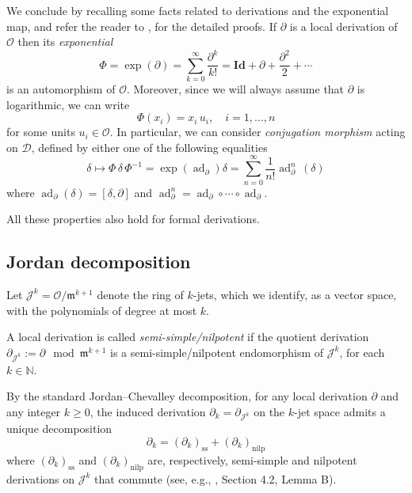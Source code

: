 \documentclass[10pt,twoside,reqno]{amsart}
\theoremstyle{remark}
\theoremstyle{remark}
\newcommand{\ad}{\operatorname{ad}}
\newcommand{\tmop}[1]{{\operatorname{#1}}}
\newcommand{\oO}{\mathcal{O}}
\newcommand{\cD}{\mathcal{D}}
\newcommand{\vO}{\mathcal{O}}
\begin{document}
We conclude by recalling some facts related to derivations and the exponential map, and refer the reader to \cite{Bourbaki2007},  for the detailed proofs. If $\partial$ is a local derivation of $\oO$ then its {\em exponential}
\begin{equation}\label{exponential-formula}
\Phi = \exp(\partial) = \sum_{k=0}^\infty \frac{\partial^k}{k !} = \mathbf{Id} + \partial + \frac{\partial^2}{2}+\cdots
\end{equation}
is an automorphism of $\oO$. Moreover, since we will always assume that $\partial$ is logarithmic, we can write
$$\Phi(x_i) = x_i\, u_i,\quad i=1,\ldots,n$$
for some units $u_i \in \oO$. In particular, we can consider {\em conjugation morphism} acting on $\cD$, defined by either one of the following equalities 
\begin{equation}\label{conjugation-morphism}
\delta \mapsto  \Phi\, \delta\, \Phi^{-1} = \exp(\ad_\partial) \delta = \sum_{n=0}^\infty \frac{1}{n!} \ad_\partial^n\, (\delta)
\end{equation}
where $\ad_\partial (\delta) = [\delta,\partial]$ and $\ad_\partial^n = \ad_\partial \circ \cdots \circ \ad_\partial$. 

All these properties also hold for formal derivations.


\subsection{Jordan decomposition}\label{subsect-jordan-decomp}

Let $\mathcal{J}^k = \vO / \mathfrak{m}^{k + 1}$ denote the ring of $k$-jets,
which we identify, as a vector space, with the polynomials of degree at most
$k$. 

A local derivation is called \emph{semi-simple/nilpotent} if the quotient derivation
${\partial_{\mathcal{J}^k}}:= \partial \mod \mathfrak{m}^{k+1} $ is a semi-simple/nilpotent endomorphism of $\mathcal{J}^k$, for
each $k \in \mathbb{N}$.  

By the standard Jordan--Chevalley decomposition, for any local derivation $\partial$ and any integer $k \ge 0$, the induced derivation $\partial_k = {\partial_{\mathcal{J}^k}}$ on the $k$-jet space admits a unique decomposition
$$
\partial_k = (\partial_k)_{\tmop{ss}} + (\partial_k)_{\tmop{nilp}}
$$
where $(\partial_k)_{\tmop{ss}}$ and $(\partial_k)_{\tmop{nilp}}$ are, respectively, semi-simple and nilpotent derivations on $\mathcal{J}^k$ that commute (see, e.g., \cite{humphreys1972}, Section 4.2, Lemma B). 
\end{document}
